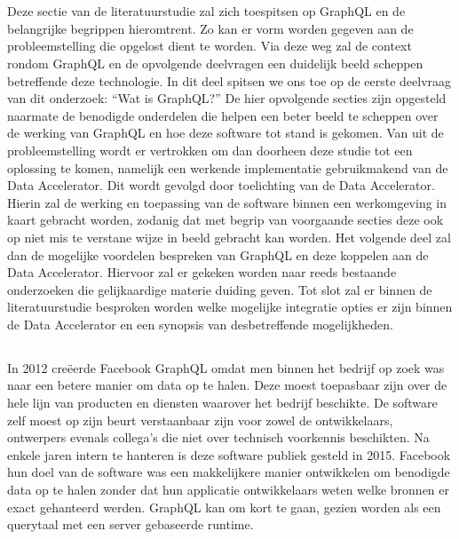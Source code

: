 \section{}%
\label{sec:GraphQL}
Deze sectie van de literatuurstudie zal zich toespitsen op GraphQL en de belangrijke begrippen hieromtrent. Zo kan er vorm worden gegeven aan de probleemstelling die opgelost dient te worden. Via deze weg zal de context rondom GraphQL en de opvolgende deelvragen een duidelijk beeld scheppen betreffende deze technologie.
In dit deel spitsen we ons toe op de eerste deelvraag van dit onderzoek: “Wat is GraphQL?”
De hier opvolgende secties zijn opgesteld naarmate de benodigde onderdelen die helpen een beter beeld te scheppen over de werking van GraphQL en hoe deze software tot stand is gekomen. Van uit de probleemstelling wordt er vertrokken om dan doorheen deze studie tot een oplossing te komen, namelijk een werkende implementatie gebruikmakend van de Data Accelerator.
Dit wordt gevolgd door toelichting van de Data Accelerator. Hierin zal de werking en toepassing van de software binnen een werkomgeving in kaart gebracht worden, zodanig dat met begrip van voorgaande secties deze ook op niet mis te verstane wijze in beeld gebracht kan worden.
Het volgende deel zal dan de mogelijke voordelen bespreken van GraphQL en deze koppelen aan de Data Accelerator. Hiervoor zal er gekeken worden naar reeds bestaande onderzoeken die gelijkaardige materie duiding geven.
Tot slot zal er binnen de literatuurstudie besproken worden welke mogelijke integratie opties er zijn binnen de Data Accelerator en een synopsis van desbetreffende mogelijkheden.

\subsection{}%
\label{sec:Gegevens ophalen}
In 2012 creëerde Facebook GraphQL omdat men binnen het bedrijf op zoek was naar een betere manier om data op te halen. Deze moest toepasbaar zijn over de hele lijn van producten en diensten waarover het bedrijf beschikte. De software zelf moest op zijn beurt verstaanbaar zijn voor zowel de ontwikkelaars, ontwerpers evenals collega’s die niet over technisch voorkennis beschikten. Na enkele jaren intern te hanteren is deze software publiek gesteld in 2015. Facebook hun doel van de software was een makkelijkere manier ontwikkelen om benodigde data op te halen zonder dat hun applicatie ontwikkelaars weten welke bronnen er exact gehanteerd werden. GraphQL kan om kort te gaan, gezien worden als een querytaal met een server gebaseerde runtime.

